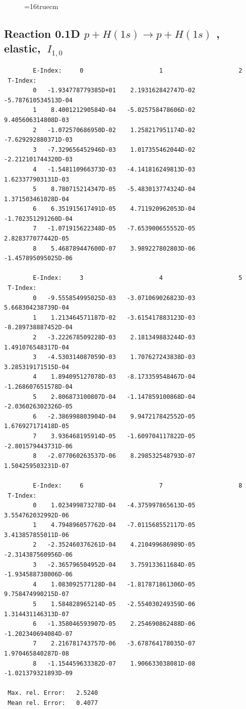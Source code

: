 \documentclass[12pt,dvipdfmx]{article}
\begin{document}
\begin{figure} \label{0.1T}
\epsfxsize=16truecm
\end{figure}
\newpage


\subsection{
Reaction 0.1D  $p + H(1s) \rightarrow  p + H(1s)$ ,
elastic, $\ I_{1,0}$
}

\begin{small}\begin{verbatim}
        E-Index:     0                     1                     2
 T-Index:
        0   -1.934778779385D+01    2.193162842747D-02   -5.787610534513D-04
        1    8.400121290584D-04   -5.025758478606D-02    9.405606314808D-03
        2   -1.072570686950D-02    1.258217951174D-02   -7.629292880371D-03
        3   -7.329656452946D-03    1.017355462044D-02   -2.212101744320D-03
        4   -1.548110966373D-03   -4.141816249813D-03    1.623377903131D-03
        5    8.780715214347D-05   -5.483013774324D-04    1.371503461028D-04
        6    6.351915617491D-05    4.711920962053D-04   -1.702351291260D-04
        7   -1.071915622348D-05   -7.653900655552D-05    2.828377077442D-05
        8    5.468789447600D-07    3.989227802803D-06   -1.457895095025D-06

        E-Index:     3                     4                     5
 T-Index:
        0   -9.555854995025D-03   -3.071069026823D-03    5.668304238739D-04
        1    1.213464571187D-02   -3.615417883123D-03   -8.289738887452D-04
        2   -3.222678509228D-03    2.181349883244D-03    1.491076548317D-04
        3   -4.530314087059D-03    1.707627243838D-03    3.285319171515D-04
        4    1.894095127078D-03   -8.173359548467D-04   -1.268607651578D-04
        5    2.806873100807D-04   -1.147859100868D-04   -2.036026302326D-05
        6   -2.386998803904D-04    9.947217842552D-05    1.676927171418D-05
        7    3.936468195914D-05   -1.609704117822D-05   -2.801579443731D-06
        8   -2.077060263537D-06    8.298532548793D-07    1.504259503231D-07

        E-Index:     6                     7                     8
 T-Index:
        0    1.023499873278D-04   -4.375997865613D-05    3.554762032992D-06
        1    4.794896057762D-04   -7.011568552117D-05    3.413857855011D-06
        2   -2.352460376261D-04    4.210499686989D-05   -2.314387560956D-06
        3   -2.365796504952D-04    3.759133611684D-05   -1.934588738006D-06
        4    1.083092577128D-04   -1.817871861306D-05    9.758474990215D-07
        5    1.584828965214D-05   -2.554030249359D-06    1.314431146313D-07
        6   -1.358046593907D-05    2.254690862488D-06   -1.202340694084D-07
        7    2.216781743757D-06   -3.678764178035D-07    1.970465840287D-08
        8   -1.154459633382D-07    1.906633038081D-08   -1.021379321893D-09

 Max. rel. Error:   2.5240
 Mean rel. Error:   0.4077
\end{verbatim}\end{small}
\end{document}
